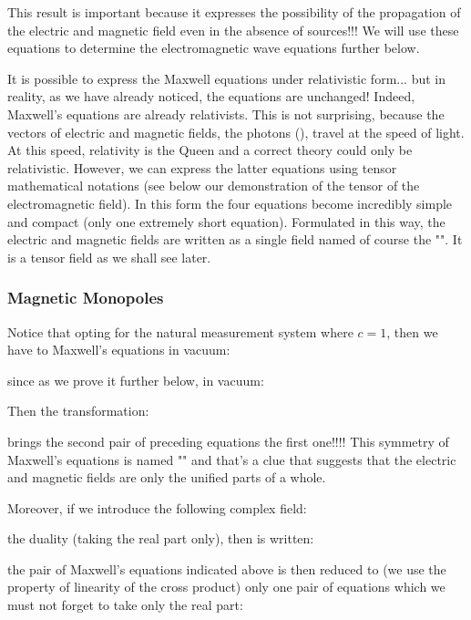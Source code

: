	This result is important because it expresses the possibility of the propagation of the electric and magnetic field even in the absence of sources!!! We will use these equations to determine the electromagnetic wave equations further below.
	\begin{tcolorbox}[title=Remark,colframe=black,arc=10pt]
	It is possible to express the Maxwell equations under relativistic form... but in reality, as we have already noticed, the equations are unchanged! Indeed, Maxwell's equations are already relativists. This is not surprising, because the vectors of electric and magnetic fields, the photons (), travel at the speed of light. At this speed, relativity is the Queen and a correct theory could only be relativistic. However, we can express the latter equations using tensor mathematical notations (see below our demonstration of the tensor of the electromagnetic field). In this form the four equations become incredibly simple and compact (only one extremely short equation). Formulated in this way, the electric and magnetic fields are written as a single field named of course the "". It is a tensor field as we shall see later.
	\end{tcolorbox}
	

	\subsubsection{Magnetic Monopoles}
	Notice that opting for the natural measurement system where $c=1$, then we have to Maxwell's equations in vacuum:
	
	since as we prove it further below, in vacuum:
	
	Then the transformation:
	
	brings the second pair of preceding equations the first one!!!! This symmetry of Maxwell's equations is named "" and that's a clue that suggests that the electric and magnetic fields are only the unified parts of a whole.
	
	Moreover, if we introduce the following complex field:
	
	the duality (taking the real part only), then is written:
	
	the pair of Maxwell's equations indicated above is then reduced to (we use the property of linearity of the cross product) only one pair of equations which we must not forget to take only the real part:
	
